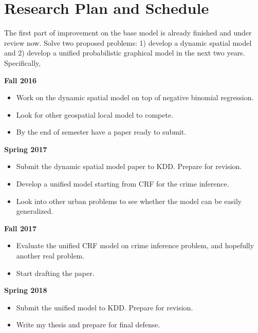 \chapter{Research Plan and Schedule}
\label{ch:plan}



The first part of improvement on the base model is already finished and under review now. Solve two proposed problems: 1) develop a dynamic spatial model and 2) develop a unified probabilistic graphical model in the next two years.
Specifically,

\textbf{Fall 2016}
\begin{itemize}
\item Work on the dynamic spatial model on top of negative binomial regression.
\item Look for other geospatial local model to compete.
\item By the end of semester have a paper ready to submit.
\end{itemize}


\textbf{Spring 2017}
\begin{itemize}
\item Submit the dynamic spatial model paper to KDD. Prepare for revision.
\item Develop a unified model starting from CRF for the crime inference.
\item Look into other urban problems to see whether the model can be easily generalized.
\end{itemize}



\textbf{Fall 2017}
\begin{itemize}
\item Evaluate the unified CRF model on crime inference problem, and hopefully another real problem.
\item Start drafting the paper.
\end{itemize}



\textbf{Spring 2018}
\begin{itemize}
\item Submit the unified model to KDD. Prepare for revision.
\item Write my thesis and prepare for final defense.
\end{itemize}

